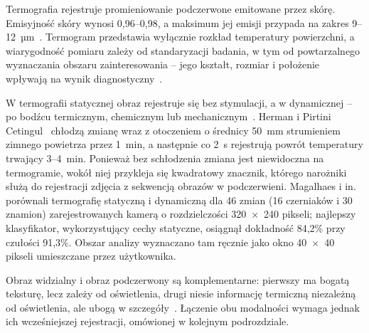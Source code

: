Termografia rejestruje promieniowanie podczerwone emitowane przez skórę. Emisyjność skóry wynosi 0,96--0,98, a maksimum jej emisji przypada na zakres 9--12~µm~\cite{infared-thermal-imaging}. Termogram przedstawia wyłącznie rozkład temperatury powierzchni, a wiarygodność pomiaru zależy od standaryzacji badania, w tym od powtarzalnego wyznaczania obszaru zainteresowania -- jego kształt, rozmiar i położenie wpływają na wynik diagnostyczny~\cite{infared-thermal-imaging}.

W termografii statycznej obraz rejestruje się bez stymulacji, a w dynamicznej -- po bodźcu termicznym, chemicznym lub mechanicznym~\cite{magalhaes2019}. Herman i Pirtini Cetingul~\cite{visualization-detection-cancer} chłodzą zmianę wraz z otoczeniem o średnicy 50~mm strumieniem zimnego powietrza przez 1~min, a następnie co 2~s rejestrują powrót temperatury trwający 3--4~min. Ponieważ bez schłodzenia zmiana jest niewidoczna na termogramie, wokół niej przykleja się kwadratowy znacznik, którego narożniki służą do rejestracji zdjęcia z sekwencją obrazów w podczerwieni. Magalhaes i in.~\cite{magalhaes2019} porównali termografię statyczną i dynamiczną dla 46 zmian (16 czerniaków i 30 znamion) zarejestrowanych kamerą o rozdzielczości 320~$\times$~240 pikseli; najlepszy klasyfikator, wykorzystujący cechy statyczne, osiągnął dokładność 84,2\% przy czułości 91,3\%. Obszar analizy wyznaczano tam ręcznie jako okno 40~$\times$~40 pikseli umieszczane przez użytkownika.


Obraz widzialny i obraz podczerwony są komplementarne: pierwszy ma bogatą teksturę, lecz zależy od oświetlenia, drugi niesie informację termiczną niezależną od oświetlenia, ale ubogą w szczegóły~\cite{deep-learning}. Łączenie obu modalności wymaga jednak ich wcześniejszej rejestracji, omówionej w kolejnym podrozdziale.

